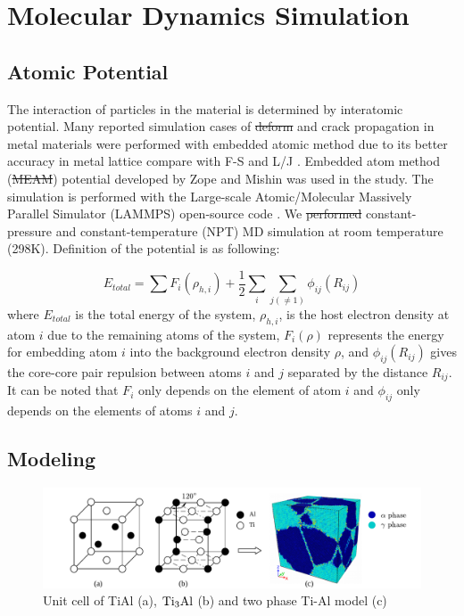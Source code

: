 \documentclass[materials,article,submit,moreauthors,pdftex,10pt,a4paper]{Definitions/mdpi}
\providecommand{\DIFadd}[1]{{\protect\color{blue}\uwave{#1}}} %
\providecommand{\DIFdel}[1]{{\protect\color{red}\sout{#1}}}                      %
\providecommand{\DIFaddbegin}{} %
\providecommand{\DIFaddend}{} %
\providecommand{\DIFdelbegin}{} %
\providecommand{\DIFdelend}{} %
\begin{document}
\section{Molecular Dynamics Simulation }\label{section:method}
\subsection{Atomic Potential}

The interaction of particles in the material is determined by interatomic potential. Many reported simulation cases of \DIFdelbegin \DIFdel{deform }\DIFdelend \DIFaddbegin \DIFadd{deforming }\DIFaddend and crack propagation in metal materials were performed with embedded atomic method due to its better accuracy in metal lattice compare with F-S and L/J \cite{Ko2015,Zepeda-Ruiz2017,Fan2018a}. Embedded atom method (\DIFdelbegin \DIFdel{MEAM}\DIFdelend \DIFaddbegin \DIFadd{EAM}\DIFaddend ) potential developed by Zope and Mishin \cite{Zope2003} was used in the study. The simulation is performed  with the Large-scale Atomic/Molecular Massively Parallel Simulator (LAMMPS) open-source code \cite{Plimpton1995}. We \DIFdelbegin \DIFdel{performed }\DIFdelend \DIFaddbegin \DIFadd{did }\DIFaddend constant-pressure and constant-temperature (NPT) MD simulation at room temperature (298K). Definition of the potential is as following:

\begin{equation} \label{eq:eam} 
E_{total}= \displaystyle\sum F_i(\rho_{h,i})+\frac{1}{2}\sum_i\sum_{j(\neq1)}\phi_{ij}(R_{ij})
\end{equation}
where $E_{total}$ is the total energy of the system, $\rho_{h,i}$, is the host electron density at atom $i$ due to the remaining atoms of the system, $F_i(\rho)$ represents the energy for embedding atom $i$ into the background electron density $\rho$, and $\phi_{ij}(R_{ij})$ gives the core-core pair repulsion between atoms $i$ and $j$ separated by the distance $R_{ij}$. It can be noted that $F_i$ only depends on the element of atom $i$ and $\phi_{ij}$ only depends on the elements of atoms $i$ and $j$. 

\DIFdelbegin %
\DIFdelend \DIFaddbegin \subsection{Modeling}
\DIFaddend \begin{figure}[ht]
	\centering
	\includegraphics[width=1\linewidth]{img/modeling}
	\caption{Unit cell of \rm{TiAl} (a), $\rm{Ti_3Al}$ (b) and two phase Ti-Al model (c)}
	\label{fig:tial-cell}
\end{figure}
\end{document}
